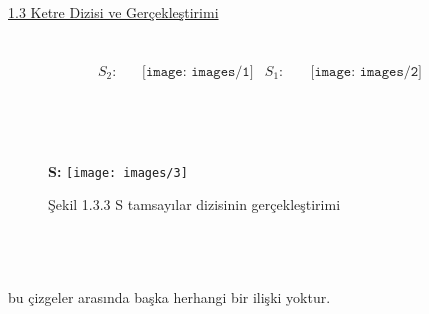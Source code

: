 \documentclass[11pt]{amsbook}
\begin{document}
\underline{1.3 Ketre Dizisi ve Gerçekleştirimi \hspace*{70ex} }\\ \\ \\
	\begin{align*}
		 S_2: & \ \ \ \ \texttt{[image: images/1]}& S_1:& \quad  \texttt{[image: images/2]}\\
	\end{align*}
\\ \\ \\
	\begin{figure}[htb]
	    \textbf{S:}
	    \texttt{[image: images/3]}
		\caption*{ Şekil 1.3.3 S tamsayılar dizisinin gerçekleştirimi }
		\label{fig:Bb}
	\end{figure}\\ \\ \\
bu çizgeler arasında başka herhangi bir ilişki yoktur.
\end{document}

